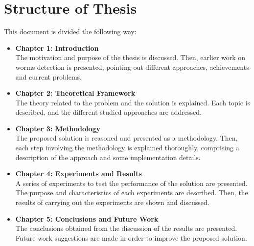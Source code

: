 \section{Structure of Thesis}
This document is divided the following way:
\begin{itemize}
\item \textbf{Chapter 1: Introduction}\\
  The motivation and purpose of the thesis is discussed. Then, earlier work
  on worms detection is presented, pointing out different approaches, achievements
  and current problems.
\item \textbf{Chapter 2: Theoretical Framework}\\
  The theory related to the problem and the solution is explained. Each topic is described,
  and the different studied approaches are addressed.
\item \textbf{Chapter 3: Methodology}\\
  The proposed solution is reasoned and presented as a methodology. Then, each step 
  involving the methodology is explained thoroughly, comprising a description of the 
  approach and some implementation details.
\item \textbf{Chapter 4: Experiments and Results}\\
  A series of experiments to test the performance of the solution are presented. 
  The purpose and characteristics of each experiments are described. Then, the results
  of carrying out the experiments are shown and discussed.
\item \textbf{Chapter 5: Conclusions and Future Work}\\
  The conclusions obtained from the discussion of the results are presented. Future
  work suggestions are made in order to improve the proposed solution.
\end{itemize}